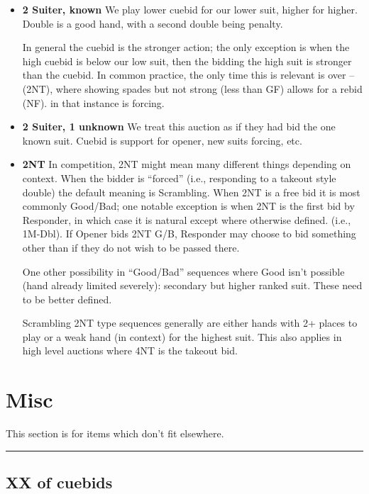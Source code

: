 \documentclass[main]{subfile}
\begin{document}
\begin{itemize}[]
\item \textbf{2 Suiter, known} We play lower cuebid for our lower suit, higher for higher. Double is a good hand, with a second double being penalty.

In general the cuebid is the stronger action; the only exception is when the high cuebid is below our low suit, then the bidding the high suit is stronger than the cuebid.  In common practice, the only time this is relevant is over --(2NT), where  showing spades but not strong (less than GF) allows for a  rebid (NF).  in that instance is forcing.	

\item \textbf{2 Suiter, 1 unknown} We treat this auction as if they had bid the one known suit. Cuebid is support for opener, new suits forcing, etc.

\item \textbf{2NT} In competition, 2NT might mean many different things depending on context. When the bidder is ``forced'' (i.e., responding to a takeout style double) the default meaning is Scrambling. When 2NT is a free bid it is most commonly Good/Bad; one notable exception is when 2NT is the first bid by Responder, in which case it is natural except where otherwise defined. (i.e., 1M-Dbl).  If Opener bids 2NT G/B, Responder may choose to bid something other than  if they do not wish to be passed there.

One other possibility in ``Good/Bad'' sequences where Good isn't possible (hand already limited severely): secondary but higher ranked suit. These need to be better defined.

Scrambling 2NT type sequences generally are either hands with 2+ places to play or a weak hand (in context) for the highest suit.  This also applies in high level auctions where 4NT is the takeout bid.
 
\end{itemize}

\section{Misc}

This section is for items which don't fit elsewhere.

\vspace{1em}\hrule

\subsection{XX of cuebids}
\end{document}
